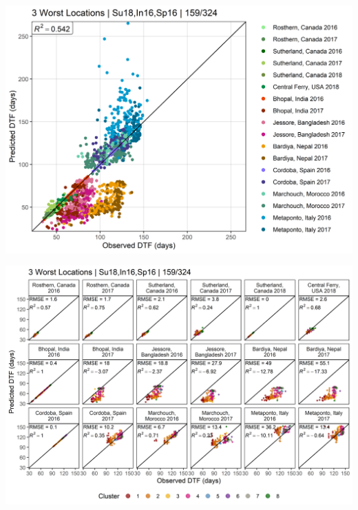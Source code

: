 \documentclass[
]{article}
\begin{document}
\includegraphics{Additional/Model/Model_1_5.png}

\includegraphics{Additional/Model/Model_2_5.png}
\end{document}
